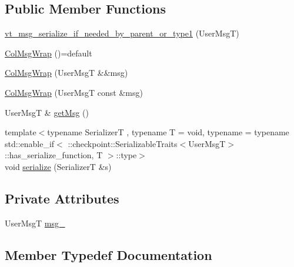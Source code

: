 \subsection*{Public Member Functions}
\begin{DoxyCompactItemize}
\item 
\hyperlink{structvt_1_1vrt_1_1collection_1_1_col_msg_wrap_a016c2ea5370660027aa23dc0dcf44a74}{vt\+\_\+msg\+\_\+serialize\+\_\+if\+\_\+needed\+\_\+by\+\_\+parent\+\_\+or\+\_\+type1} (User\+MsgT)
\item 
\hyperlink{structvt_1_1vrt_1_1collection_1_1_col_msg_wrap_a341d1ea25fb9181d1c06ab66df1478f9}{Col\+Msg\+Wrap} ()=default
\item 
\hyperlink{structvt_1_1vrt_1_1collection_1_1_col_msg_wrap_a9dfc351adf1f31fda9028608d989ce5c}{Col\+Msg\+Wrap} (User\+MsgT \&\&msg)
\item 
\hyperlink{structvt_1_1vrt_1_1collection_1_1_col_msg_wrap_ac19f3573a80a849d41fd5874fe94414a}{Col\+Msg\+Wrap} (User\+MsgT const \&msg)
\item 
User\+MsgT \& \hyperlink{structvt_1_1vrt_1_1collection_1_1_col_msg_wrap_a69d30485a72651a7ede17f6bcdb13cd4}{get\+Msg} ()
\item 
{\footnotesize template$<$typename SerializerT , typename T  = void, typename  = typename std\+::enable\+\_\+if$<$      \+::checkpoint\+::\+Serializable\+Traits$<$\+User\+Msg\+T$>$\+::has\+\_\+serialize\+\_\+function, T    $>$\+::type$>$ }\\void \hyperlink{structvt_1_1vrt_1_1collection_1_1_col_msg_wrap_ad225439a1358090be0ad57cb536eb1d3}{serialize} (SerializerT \&s)
\end{DoxyCompactItemize}
\subsection*{Private Attributes}
\begin{DoxyCompactItemize}
\item 
User\+MsgT \hyperlink{structvt_1_1vrt_1_1collection_1_1_col_msg_wrap_a781048274a322da08bc83a90adc8d37e}{msg\+\_\+}
\end{DoxyCompactItemize}


\subsection{Member Typedef Documentation}
\mbox{\label{structvt_1_1vrt_1_1collection_1_1_col_msg_wrap_a51803f5a5355ade7dc2d1a46753ab4e9}} 
